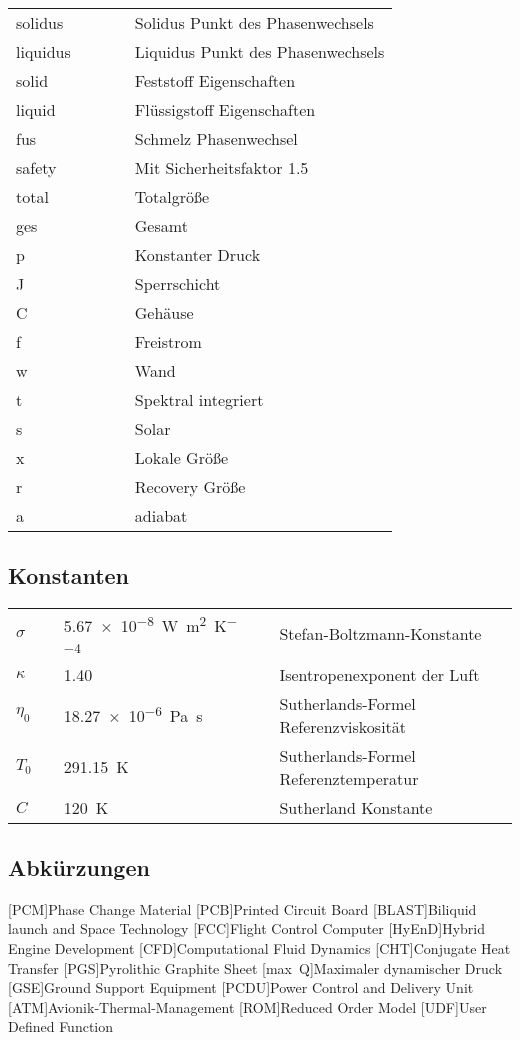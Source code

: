 \begin{supertabular}{p{10mm}p{3mm}p{20mm}p{3mm}l}
solidus && && Solidus Punkt des Phasenwechsels\\
liquidus && && Liquidus Punkt des Phasenwechsels\\
solid && && Feststoff Eigenschaften\\
liquid && && Flüssigstoff Eigenschaften\\
fus && && Schmelz Phasenwechsel\\
safety && && Mit Sicherheitsfaktor 1.5\\
total && && Totalgröße\\
ges && && Gesamt\\
p && && Konstanter Druck\\
J && && Sperrschicht\\
C && && Gehäuse\\
f && && Freistrom\\
w && && Wand\\
t && && Spektral integriert\\
s && && Solar\\
x && && Lokale Größe\\
r && && Recovery Größe\\
a && && adiabat\\
\end{supertabular} 

\subsection*{Konstanten}

\begin{supertabular}{p{10mm}p{3mm}p{50mm}p{3mm}l}
$\sigma$ && \SI{5.67e-8}{\watt\per\meter\squared\per\kelvin\tothe{4}} && Stefan-Boltzmann-Konstante\\
$\kappa$ && \SI{1.40}{} && Isentropenexponent der Luft\\
$\eta_0$ && \SI{18.27e-6}{\pascal\second} && Sutherlands-Formel Referenzviskosität\\
$T_0$ && \SI{291.15}{\kelvin} && Sutherlands-Formel Referenztemperatur\\
$C$ && \SI{120}{\kelvin} && Sutherland Konstante\\
\end{supertabular}

\newpage

\subsection*{Abkürzungen}
\begin{acronym}[BLAST]
[PCM]{Phase Change Material}
[PCB]{Printed Circuit Board}
[BLAST]{Biliquid launch and Space Technology}
[FCC]{Flight Control Computer}
[HyEnD]{Hybrid Engine Development}
[CFD]{Computational Fluid Dynamics}
[CHT]{Conjugate Heat Transfer}
[PGS]{Pyrolithic Graphite Sheet}
[max~Q]{Maximaler dynamischer Druck}
[GSE]{Ground Support Equipment}
[PCDU]{Power Control and Delivery Unit}
[ATM]{Avionik-Thermal-Management}
[ROM]{Reduced Order Model}
[UDF]{User Defined Function}
\end{acronym}